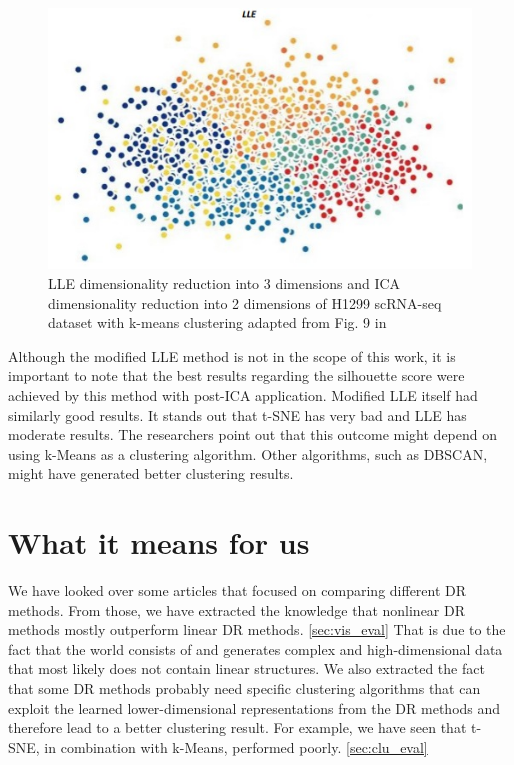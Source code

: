 \begin{figure}[!]
	\centering
	\includegraphics[width=\columnwidth]{images/lle_related_work.jpg}
	\caption[LLE dimensionality reduction and k-means clustering]{LLE dimensionality reduction into 3 dimensions and ICA dimensionality reduction into 2 dimensions of H1299 scRNA-seq dataset with k-means clustering adapted from Fig. 9 in \cite{Vasighizaker22}}
    \label{fig:lle_related_work}
\end{figure}

Although the modified LLE method is not in the scope of this work, it is important to note that the best results regarding the silhouette score were achieved by this method with post-ICA application. Modified LLE itself had similarly good results. It stands out that t-SNE has very bad and LLE has moderate results. The researchers point out that this outcome might depend on using k-Means as a clustering algorithm. Other algorithms, such as DBSCAN, might have generated better clustering results.

\section{What it means for us} \label{sec:what_does_this_mean_for_us?}

We have looked over some articles that focused on comparing different DR methods. From those, we have extracted the knowledge that nonlinear DR methods mostly outperform linear DR methods. \ref{sec:vis_eval} That is due to the fact that the world consists of and generates complex and high-dimensional data that most likely does not contain linear structures. We also extracted the fact that some DR methods probably need specific clustering algorithms that can exploit the learned lower-dimensional representations from the DR methods and therefore lead to a better clustering result. For example, we have seen that t-SNE, in combination with k-Means, performed poorly. \ref{sec:clu_eval}

